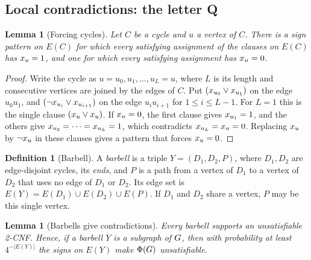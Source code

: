 \documentclass[11pt,a4paper]{article}
\newtheorem{lemma}[theorem]{Lemma}
\theoremstyle{definition}
\newtheorem{definition}[theorem]{Definition}
\theoremstyle{remark}
\theoremstyle{plain}
\theoremstyle{definition}
\begin{document}
\subsection{Local contradictions: the letter Q}

\begin{lemma}[Forcing cycles]\label{lem:forcing}
Let \(C\) be a cycle and \(u\) a vertex of \(C\). There is a sign pattern on
\(E(C)\) for which every satisfying assignment of the clauses on \(E(C)\) has
\(x_{u}=1\), and one for which every satisfying assignment has \(x_{u}=0\).
\end{lemma}

\begin{proof}
Write the cycle as \(u=u_0,u_1,\dots,u_L=u\), where \(L\) is its length and
consecutive vertices are joined by the edges of \(C\). Put
\((x_{u_0}\vee x_{u_1})\) on the edge \(u_0u_1\), and
\((\neg x_{u_i}\vee x_{u_{i+1}})\) on the edge \(u_iu_{i+1}\) for
\(1\le i\le L-1\). For \(L=1\) this is the single clause \((x_{u}\vee x_{u})\). If
\(x_{u}=0\), the first clause gives \(x_{u_1}=1\), and the others give
\(x_{u_2}=\dots=x_{u_L}=1\), which contradicts \(x_{u_L}=x_{u}=0\). Replacing
\(x_{u}\) by \(\neg x_{u}\) in these clauses gives a pattern that forces
\(x_{u}=0\).
\end{proof}

\begin{definition}[Barbell]\label{def:barbell}
A \emph{barbell} is a triple \(Y=(D_1,D_2,P)\), where \(D_1,D_2\) are
edge-disjoint cycles, its \emph{ends}, and \(P\) is a path from a vertex of
\(D_1\) to a vertex of \(D_2\) that uses no edge of \(D_1\) or \(D_2\). Its edge
set is \(E(Y)=E(D_1)\cup E(D_2)\cup E(P)\). If \(D_1\) and \(D_2\) share a
vertex, \(P\) may be this single vertex.
\end{definition}

\begin{lemma}[Barbells give contradictions]\label{lem:barbell-unsat}
Every barbell supports an unsatisfiable 2-CNF. Hence, if a barbell \(Y\) is a
subgraph of \(G\), then with probability at least \(4^{-|E(Y)|}\) the signs on
\(E(Y)\) make \(\Phi(G)\) unsatisfiable.
\end{lemma}
\end{document}
